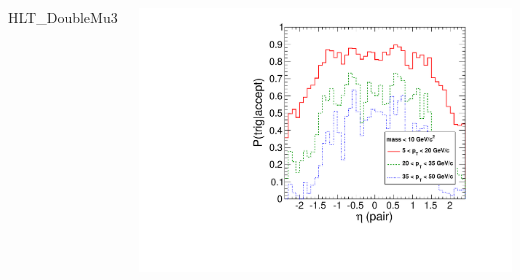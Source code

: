 \documentclass[compress]{beamer}
\begin{document}
\begin{frame}
\begin{columns}
\centering HLT\_DoubleMu3

\includegraphics[width=\linewidth]{eta_mass10cut_DMu3.pdf}
\end{columns}
\end{frame}
\end{document}
